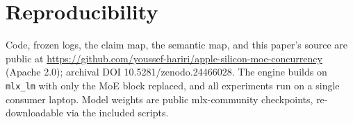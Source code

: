 \documentclass[11pt]{article}
\begin{document}
\section*{Reproducibility}
Code, frozen logs, the claim map, the semantic map, and this paper's source
are public at \url{https://github.com/youssef-hariri/apple-silicon-moe-concurrency}
(Apache 2.0); archival DOI 10.5281/zenodo.24466028. The engine builds on
\texttt{mlx\_lm} with only the MoE block replaced, and all experiments run
on a single consumer laptop. Model weights are public mlx-community
checkpoints, re-downloadable via the included scripts.
\end{document}
